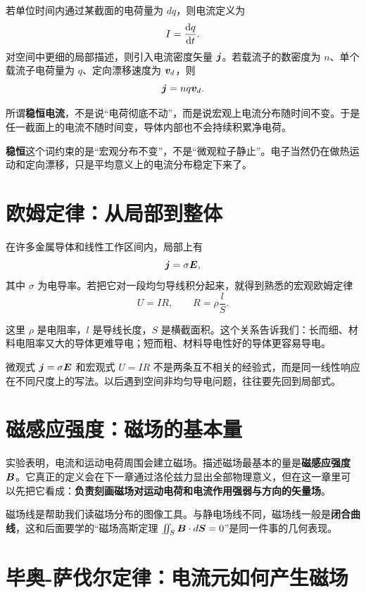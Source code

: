 \documentclass[lang=cn,11pt]{elegantbook}
\begin{document}
若单位时间内通过某截面的电荷量为 \(dq\)，则电流定义为
\[
I=\dv{q}{t}.
\]
对空间中更细的局部描述，则引入电流密度矢量 \(\vb*{j}\)。若载流子的数密度为 \(n\)、单个载流子电荷量为 \(q\)、定向漂移速度为 \(\vb*{v}_d\)，则
\[
\vb*{j}=nq\vb*{v}_d.
\]

所谓\textbf{稳恒电流}，不是说“电荷彻底不动”，而是说宏观上电流分布随时间不变。于是任一截面上的电流不随时间变，导体内部也不会持续积累净电荷。

\begin{note}
\textbf{稳恒}这个词约束的是“宏观分布不变”，不是“微观粒子静止”。电子当然仍在做热运动和定向漂移，只是平均意义上的电流分布稳定下来了。
\end{note}

\section{欧姆定律：从局部到整体}

在许多金属导体和线性工作区间内，局部上有
\[
\vb*{j}=\sigma \vb*{E},
\]
其中 \(\sigma\) 为电导率。若把它对一段均匀导线积分起来，就得到熟悉的宏观欧姆定律
\[
U=IR,
\qquad
R=\rho\frac{l}{S}.
\]

这里 \(\rho\) 是电阻率，\(l\) 是导线长度，\(S\) 是横截面积。这个关系告诉我们：长而细、材料电阻率又大的导体更难导电；短而粗、材料导电性好的导体更容易导电。

\begin{remark}
微观式 \(\vb*{j}=\sigma\vb*{E}\) 和宏观式 \(U=IR\) 不是两条互不相关的经验式，而是同一线性响应在不同尺度上的写法。以后遇到空间非均匀导电问题，往往要先回到局部式。
\end{remark}

\section{磁感应强度：磁场的基本量}

实验表明，电流和运动电荷周围会建立磁场。描述磁场最基本的量是\textbf{磁感应强度} \(\vb*{B}\)。它真正的定义会在下一章通过洛伦兹力显出全部物理意义，但在这一章里可以先把它看成：\textbf{负责刻画磁场对运动电荷和电流作用强弱与方向的矢量场}。

磁场线是帮助我们读磁场分布的图像工具。与静电场线不同，磁场线一般是\textbf{闭合曲线}，这和后面要学的“磁场高斯定理 \(\iint_S \vb*{B}\cdot d\vb*{S}=0\)”是同一件事的几何表现。

\section{毕奥-萨伐尔定律：电流元如何产生磁场}
\end{document}
